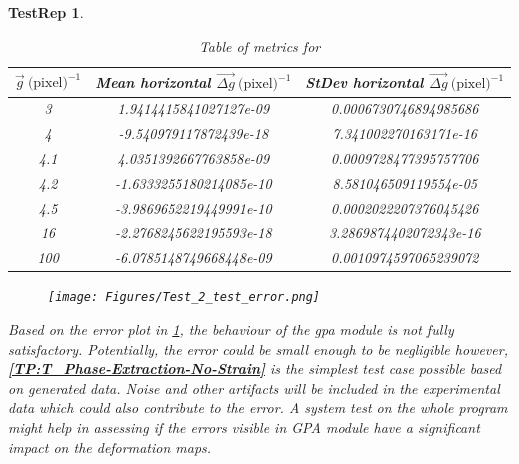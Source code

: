 \documentclass[12pt, titlepage]{article}
\newtheorem{TestRep}{TestRep}
\begin{document}
\begin{TestRep}
\begin{table}[H]
\centering
\begin{tabular}{|c|c|c|}
\hline
$\overrightarrow{g} \ \text{(pixel)}^{-1}$ & Mean horizontal $\overrightarrow{\Delta g} \ \text{(pixel)}^{-1}$ & StDev horizontal $\overrightarrow{\Delta g} \ \text{(pixel)}^{-1}$ \\
\hline
3 & 1.9414415841027127e-09 & 0.0006730746894985686 \\ \hline
\cellcolor{green} 4	 & \cellcolor{green} -9.540979117872439e-18 & \cellcolor{green} 7.341002270163171e-16 \\ \hline
\cellcolor[rgb]{1,0.8,0} 4.1 & \cellcolor[rgb]{1,0.8,0} 4.0351392667763858e-09 & \cellcolor[rgb]{1,0.8,0} 0.0009728477395757706 \\ \hline
4.2	& -1.6333255180214085e-10 & 8.581046509119554e-05 \\ \hline
4.5	& -3.9869652219449991e-10 & 0.0002022207376045426 \\ \hline
\cellcolor{green} 16 & \cellcolor{green} -2.2768245622195593e-18 & \cellcolor{green} 3.2869874402072343e-16 \\ \hline
\cellcolor[rgb]{1,0.8,0} 100 & \cellcolor[rgb]{1,0.8,0} -6.0785148749668448e-09 & \cellcolor[rgb]{1,0.8,0} 0.0010974597065239072 \\ \hline
\end{tabular}
\caption{Table of metrics for}\label{tb:Metric_test_2_multiple_cases}
\end{table}

\begin{figure}[H]
\begin{center}
\texttt{[image: Figures/Test\_2\_test\_error.png]}
\caption{}
\label{fig:Test_2_Test_error}
\end{center}
\end{figure}

Based on the error plot in \cref{fig:Test_2_Test_error}, the behaviour of the gpa module is not fully satisfactory. Potentially, the error could be small enough to be negligible however, \textbf{\cref{TP:T_Phase-Extraction-No-Strain}} is the simplest test case possible based on generated data. Noise and other artifacts will be included in the experimental data which could also contribute to the error. A system test on the whole program might help in assessing if the errors visible in GPA module have a significant impact on the deformation maps. \bigskip
\end{TestRep}
\end{document}

